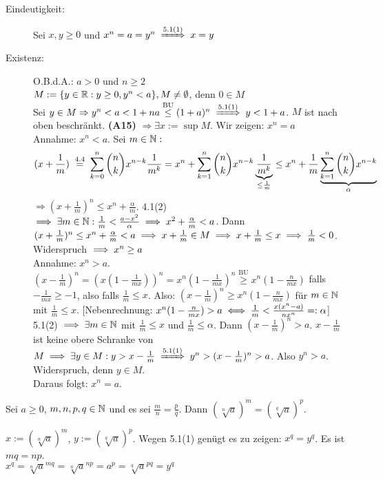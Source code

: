 \documentclass[a4paper,twoside,DIV15,BCOR12mm]{scrbook}
\begin{document}
\begin{beweis}
\begin{description}
\item[Eindeutigkeit:] Sei $x,y\ge0$ und $x^{n}=a=y^{n}\folgtwegen{5.1(1)} x=y$
\item[Existenz:] O.B.d.A.: $a>0$ und $n\ge2$\\
$M:=\{y\in\mathbb{R}:y\ge0, y^{n}<a\}, M\ne\emptyset$, denn $0\in M$\\
Sei $y\in M\Rightarrow y^{n}<a<1+na\stackrel{\text{BU}}{\le}(1+a)^{n} \folgtwegen{5.1(1)} y<1+a$. $M$ ist nach oben beschränkt. \textbf{(A15)} $\Rightarrow \exists x:=\sup{M}$. Wir zeigen: $x^{n}=a$\\
Annahme: $x^{n}<a$. Sei $m\in\mathbb{N}:$ \[(x+\frac{1}{m})\gleichwegen{4.4}\sum_{k=0}^{n}\binom{n}{k}x^{n-k}\frac{1}{m^{k}}=x^{n}+\sum_{k=1}^{n}\binom{n}{k}x^{n-k}\underbrace{\frac{1}{m^{k}}}_{\le\frac{1}{m}}\le x^{n}+\frac{1}{m}\underbrace{\sum_{k=1}^{n}\binom{n}{k}x^{n-k}}_{\alpha}\]
$\Rightarrow(x+\frac{1}{m})^{n}\le x^{n}+\frac{\alpha}{m}$. 4.1(2) $\implies \exists m \in \mathbb{N}: \frac{1}{m} < \frac{a-x^2}{\alpha} \implies x^2 + \frac{\alpha}m < a$. Dann $(x+\frac{1}m)^n \le x^n + \frac{\alpha}{m} < a \implies x + \frac{1}{m} \in M \implies x+\frac{1}{m} \le x \implies \frac{1}{m} <0 $. Widerspruch $\implies x^n \ge a$ \\
Annahme: $x^n>a$. $(x-\frac{1}{m})^n = (x(1-\frac{1}{mx}))^n = x^n(1-\frac{1}{mx})^n \stackrel{\text{BU}}{\ge} x^n(1-\frac{n}{mx})$ falls $-\frac{1}{mx} \ge -1$, also falls $\frac{1}{m} \le x $. Also: $(x-\frac{1}{m})^n \ge x^n(1-\frac{n}{mx})$ für $m\in\mathbb{N}$ mit $\frac{1}{m} \le x$. [Nebenrechnung: $x^n(1-\frac{n}{mx}) > a \iff \frac{1}{m} < \frac{x(x^n-a)}{nx^n} =: \alpha$] 5.1(2) $\implies \exists m\in\mathbb{N}$ mit $\frac{1}{m} \le x$ und $\frac{1}{m} \le \alpha$. Dann $(x-\frac{1}{m})^n > a$. $x-\frac{1}{m}$ ist keine obere Schranke von $M \folgt \exists y \in M: y> x - \frac{1}{m} \folgtnach{5.1(1)} y^n > (x-\frac{1}{m})^n >a$. Also $y^n>a$. Widerspruch, denn $y\in M$.\\
Daraus folgt: $x^n = a$.
\end{description}
\end{beweis}

\begin{satz}
Sei $a\ge 0$, $m,n,p,q \in \mathbb{N}$ und es sei $\frac{m}{n} = \frac{p}{q}$. Dann $(\sqrt[n]{a})^m = (\sqrt[q]{a})^p$.
\end{satz}

\begin{beweis}
$ x := (\sqrt[n]{a})^m$, $y:=(\sqrt[q]{a})^p$. Wegen 5.1(1) genügt es zu zeigen: $x^q = y^q$. Es ist $mq = np$. \\
$x^q = \sqrt[n]{a}^{mq} = \sqrt[n]{a}^{np} = a^p = \sqrt[q]{a}^{pq} = y^q$
\end{beweis}
\end{document}
